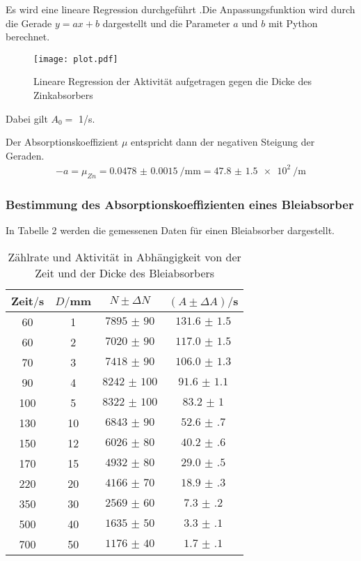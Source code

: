 Es wird eine lineare Regression durchgeführt .Die Anpassungsfunktion wird durch die Gerade $y = ax + b$  dargestellt und die Parameter $a$ und $b$
mit Python berechnet.

\begin{figure}[H]
  \centering
  \texttt{[image: plot.pdf]}
  \caption{Lineare Regression der Aktivität aufgetragen gegen die Dicke des Zinkabsorbers}
  \label{fig:plot}
\end{figure}

Dabei gilt $A_0 =$ 1/s.

Der Absorptionskoeffizient $\mu$ entspricht dann der negativen Steigung der Geraden.
\begin{align*}
  -a = \mu_{Zn} = \SI{0.0478(15)}{\per\milli\meter} = \SI{47.8(15)e2}{\per\meter}
\end{align*}

\subsubsection{Bestimmung des Absorptionskoeffizienten eines Bleiabsorber}

In Tabelle 2 werden die gemessenen Daten für einen Bleiabsorber dargestellt.

\begin{table}[H]
  \centering
  \caption{Zählrate und Aktivität in Abhängigkeit von der Zeit und der Dicke des Bleiabsorbers}
  \label{tab:Rechteckspannung}
  \begin{tabular}{c c c c}
    \toprule
    Zeit$/$s & $D/$mm & $N \pm \Delta N$ & $(A \pm \Delta A)/$s\\
    \midrule
    60 & 1 & $\num{7895(90)}$  &  $\num{131.6(15)}$ \\
    60 & 2 & $\num{7020(90)}$ &   $\num{117.0(15)}$ \\
    70 & 3 & $\num{7418(90)}$ &   $\num{106.0(13)}$ \\
    90 & 4 & $\num{8242(100)}$ &  $\num{91.6(11)}$ \\
    100 & 5 & $\num{8322(100)}$ & $\num{83.2(10)}$ \\
    130 & 10 & $\num{6843(90)}$ & $\num{52.6(7)}$ \\
    150 & 12 & $\num{6026(80)}$ & $\num{40.2(6)}$ \\
    170 & 15 & $\num{4932(80)}$ & $\num{29.0(5)}$ \\
    220 & 20 & $\num{4166(70)}$ & $\num{18.9(3)}$ \\
    350 & 30 & $\num{2569(60)}$ & $\num{7.3(2)}$ \\
    500 & 40 & $\num{1635(50)}$ & $\num{3.3(1)}$ \\
    700 & 50 & $\num{1176(40)}$ & $\num{1.7(1)}$ \\
    \bottomrule
  \end{tabular}
\end{table}

